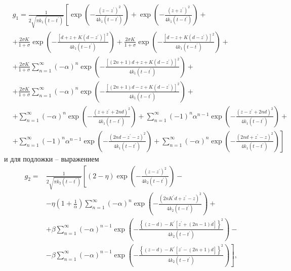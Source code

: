\begin{equation}
	\begin{aligned}
		&g_1=\frac{1}{2 \sqrt{\pi k_1\left(t-t^{\prime}\right)}}\left[\exp \left(-\frac{\left(z-z^{\prime}\right)^2}{4 k_1\left(t-t^{\prime}\right)}\right)\right.+\exp \left(-\frac{\left(z+z^{\prime}\right)^2}{4 k_1\left(t-t^{\prime}\right)}\right)+\\
		&+\frac{2 \sigma K}{1+\sigma} \exp \left(-\frac{\left[d+z+K\left(d-z^{\prime}\right)\right]^2}{4 k_1\left(t-t^{\prime}\right)}\right)+\frac{2 \sigma K}{1+\sigma} \exp \left(-\frac{\left[d-z+K\left(d-z^{\prime}\right)\right]^2}{4 k_1\left(t-t^{\prime}\right)}\right)+\\
		&+\frac{2 \sigma K}{1+\sigma} \sum_{n=1}^{\infty}(-\alpha)^n \exp \left(-\frac{\left[(2 n+1) d+z+K\left(d-z^{\prime}\right)\right]^2}{4 k_1\left(t-t^{\prime}\right)}\right)+\\
		&+\frac{2 \sigma K}{1+\sigma} \sum_{n=1}^{\infty}(-\alpha)^n \exp \left(-\frac{\left[(2 n+1) d-z+K\left(d-z^{\prime}\right)\right]^2}{4 k_1\left(t-t^{\prime}\right)}\right)+\\
		&+\sum_{n=1}^{\infty}(-\alpha)^n \exp \left(-\frac{\left(z+z^{\prime}+2 n d\right)^2}{4 k_1\left(t-t^{\prime}\right)}\right)+\sum_{n=1}^{\infty}(-1)^n \alpha^{n-1} \exp \left(-\frac{\left(z-z^{\prime}+2 n d\right)^2}{4 k_1\left(t-t^{\prime}\right)}\right)+\\
		&+\sum_{n=1}^{\infty}(-1)^n \alpha^{n-1} \exp \left(-\frac{\left(2 n d-z^{\prime}-z\right)^2}{4 k_1\left(t-t^{\prime}\right)}\right)+\left.\sum_{n=1}^{\infty}(-\alpha)^n \exp \left(-\frac{\left(2 n d+z^{\prime}-z\right)^2}{4 k_1\left(t-t^{\prime}\right)}\right)\right]
	\end{aligned}
\end{equation}
и для подложки -- выражением
\begin{equation}
	\begin{aligned}
		g_2=& \frac{1}{2 \sqrt{\pi k_2\left(t-t^{\prime}\right)}}\left[(2-\eta) \exp \left(-\frac{\left(z-z^{\prime}\right)^2}{4 k_2\left(t-t^{\prime}\right)}\right)\right.-\\
		&-\eta\left(1+\frac{1}{\alpha}\right) \sum_{n=1}^{\infty}(-\alpha)^n \exp \left(-\frac{\left(2 n K^{\prime} d+z^{\prime}-z\right)^2}{4 k_2\left(t-t^{\prime}\right)}\right)+\\
		&+\beta \sum_{n=1}^{\infty}(-\alpha)^{n-1} \exp \left(-\frac{\left\{(z-d)-K^{\prime}\left[z^{\prime}+(2 n-1) d\right]\right\}^2}{4 k_2\left(t-t^{\prime}\right)}\right)-\\
		&-\beta \sum_{n=1}^{\infty}(-\alpha)^{n-1}\left.\exp \left(-\frac{\left\{(z-d)-K^{\prime}\left[z^{\prime}-(2 n+1) d\right]\right\}^2}{4 k_2\left(t-t^{\prime}\right)}\right)\right],
	\end{aligned}
\end{equation}
